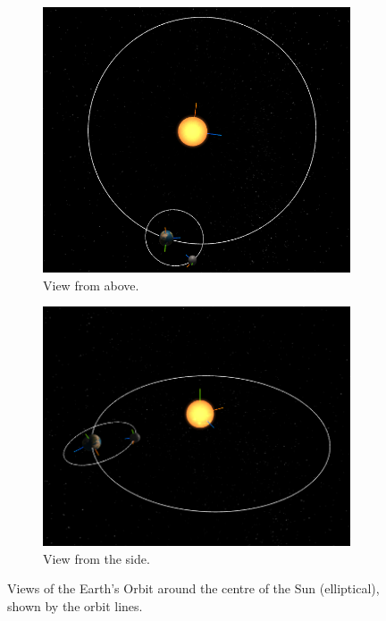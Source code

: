 \documentclass[12pt]{article}
\begin{document}
\begin{figure}[H]
        \centering
        \begin{subfigure}[b]{0.4\textwidth}
                \includegraphics[width=\textwidth]{images/earthorbitsun1}
                \caption{View from above.}
                \label{fig: The Earth orbiting the Sun}
       \end{subfigure}
        \begin{subfigure}[b]{0.4\textwidth}
                \includegraphics[width=\textwidth]{images/earthorbitsun2}
                \caption{View from the side.}
                \label{fig:The Earth orbiting the Sun}
       \end{subfigure}
       \caption{Views of the Earth's Orbit around the centre of the Sun (elliptical), shown by the orbit lines.}\label{fig: The Earth orbiting the centre of the Sun}
\end{figure}
\end{document}
